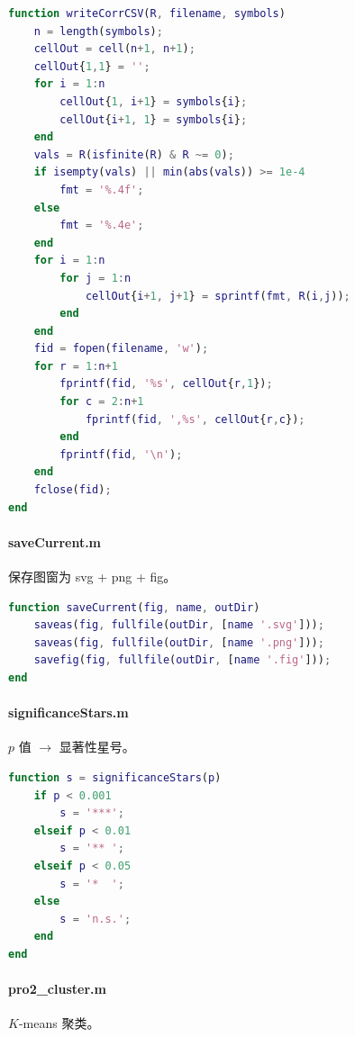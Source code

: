 \begin{lstlisting}[language=Matlab, caption={writeCorrCSV.m\quad 相关系数矩阵写入CSV}, label={code:writeCorrCSV}]
function writeCorrCSV(R, filename, symbols)
    n = length(symbols);
    cellOut = cell(n+1, n+1);
    cellOut{1,1} = '';
    for i = 1:n
        cellOut{1, i+1} = symbols{i};
        cellOut{i+1, 1} = symbols{i};
    end
    vals = R(isfinite(R) & R ~= 0);
    if isempty(vals) || min(abs(vals)) >= 1e-4
        fmt = '%.4f';
    else
        fmt = '%.4e';
    end
    for i = 1:n
        for j = 1:n
            cellOut{i+1, j+1} = sprintf(fmt, R(i,j));
        end
    end
    fid = fopen(filename, 'w');
    for r = 1:n+1
        fprintf(fid, '%s', cellOut{r,1});
        for c = 2:n+1
            fprintf(fid, ',%s', cellOut{r,c});
        end
        fprintf(fid, '\n');
    end
    fclose(fid);
end
\end{lstlisting}

\paragraph{saveCurrent.m}\quad 保存图窗为 svg + png + fig。

\begin{lstlisting}[language=Matlab, caption={saveCurrent.m\quad 保存图窗}, label={code:saveCurrent}]
function saveCurrent(fig, name, outDir)
    saveas(fig, fullfile(outDir, [name '.svg']));
    saveas(fig, fullfile(outDir, [name '.png']));
    savefig(fig, fullfile(outDir, [name '.fig']));
end
\end{lstlisting}

\paragraph{significanceStars.m}\quad $p$ 值 $\to$ 显著性星号。

\begin{lstlisting}[language=Matlab, caption={significanceStars.m\quad p值→显著性星号}, label={code:significanceStars}]
function s = significanceStars(p)
    if p < 0.001
        s = '***';
    elseif p < 0.01
        s = '** ';
    elseif p < 0.05
        s = '*  ';
    else
        s = 'n.s.';
    end
end
\end{lstlisting}

\paragraph{pro2_cluster.m}\quad $K$-means 聚类。

